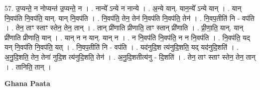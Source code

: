 \documentclass[17pt]{extarticle}
\begin{document}
57. उ॒प्यन्ते॒ न नोप्यन्त॑ उ॒प्यन्ते॒ न । . नान्ये᳚ ऽन्ये न नान्ये । . अ॒न्ये यान्. यान॒न्ये᳚ ऽन्ये यान् । . यान् नि॒वप॑ति नि॒वप॑ति॒ यान्. यान् नि॒वप॑ति । . नि॒वप॑ति॒ तेन॒ तेन॑ नि॒वप॑ति नि॒वप॑ति॒ तेन॑ । . नि॒वप॒तीति॑ नि - वप॑ति । . तेन॒ ताꣳ स्ताꣳ स्तेन॒ तेन॒ तान् । . तान् प्री॑णाति प्रीणाति॒ ताꣳ स्तान् प्री॑णाति । . प्री॒णा॒ति॒ यान्. यान् प्री॑णाति प्रीणाति॒ यान् । . यान् न न यान्. यान् न । . न नि॒वप॑ति नि॒वप॑ति॒ न न नि॒वप॑ति । . नि॒वप॑ति॒ यद् यन् नि॒वप॑ति नि॒वप॑ति॒ यत् । . नि॒वप॒तीति॑ नि - वप॑ति । . यद॑नुदि॒श त्य॑नुदि॒शति॒ यद् यद॑नुदि॒शति॑ । . अ॒नु॒दि॒शति॒ तेन॒ तेना॑ नुदि॒श त्य॑नुदि॒शति॒ तेन॑ । . अ॒नु॒दि॒शतीत्य॑नु - दि॒शति॑ । . तेन॒ ताꣳ स्ताꣳ स्तेन॒ तेन॒ तान् । . तानिति॒ तान् । \newline

\textbf{Ghana Paata } \newline
\end{document}
